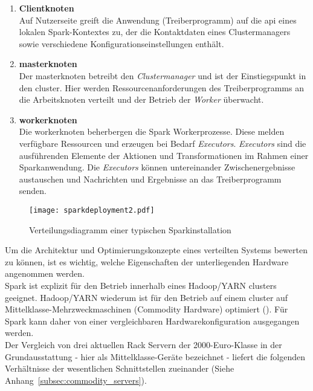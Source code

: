 \begin{enumerate}
	\item \textbf{Clientknoten}\\
	Auf Nutzerseite greift die Anwendung (Treiberprogramm) auf die \gls{api} eines lokalen Spark-Kontextes zu, der die Kontaktdaten eines Clustermanagers sowie verschiedene Konfigurationseinstellungen enthält. 
	
	\item \textbf{\gls{master}knoten}\\
	Der \gls{master}knoten betreibt den \textit{Clustermanager} und ist der Einstiegspunkt in den \gls{cluster}. Hier werden Ressourcenanforderungen des Treiberprogramms an die Arbeitsknoten verteilt und der Betrieb der \textit{Worker} überwacht.
	
	\item \textbf{\gls{worker}knoten}\\
	Die \gls{worker}knoten beherbergen die Spark Workerprozesse. Diese melden verfügbare Ressourcen und erzeugen bei Bedarf \textit{Executors}. \textit{Executors} sind die ausführenden Elemente der Aktionen und Transformationen im Rahmen einer Sparkanwendung. Die \textit{Executors} können untereinander Zwischenergebnisse austauschen und Nachrichten und Ergebnisse an das Treiberprogramm senden.
\end{enumerate}

\begin{figure}[ht!]
	\centering
  \texttt{[image: sparkdeployment2.pdf]}
	\caption{Verteilungsdiagramm einer typischen Sparkinstallation}
	\label{fig:sparkdeployment}
\end{figure}

Um die Architektur und Optimierungskonzepte eines verteilten Systems bewerten zu können, ist es wichtig, welche Eigenschaften der unterliegenden Hardware angenommen werden.\\

Spark ist explizit für den Betrieb innerhalb eines Hadoop/YARN \gls{cluster}s geeignet. Hadoop/YARN wiederum ist für den Betrieb auf einem \gls{cluster} auf Mittelklasse-Mehrzweckmaschinen (Commodity Hardware) optimiert (\cite{Mer14}). Für Spark kann daher von einer vergleichbaren Hardwarekonfiguration ausgegangen werden.\\

Der Vergleich von drei aktuellen Rack Servern der 2000-Euro-Klasse in der Grundausstattung - hier als Mittelklasse-Geräte bezeichnet - liefert die folgenden Verhältnisse der wesentlichen Schnittstellen zueinander (Siehe Anhang~\ref{subsec:commodity_servers}).

